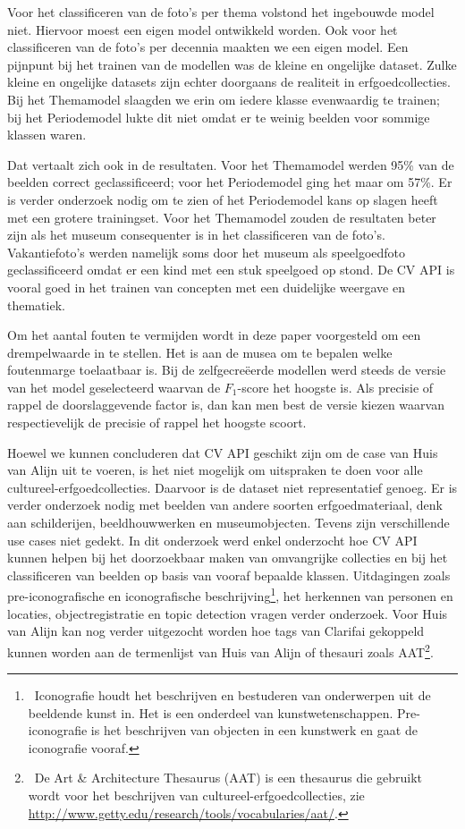 Voor het classificeren van de foto’s per thema volstond het ingebouwde model niet. Hiervoor moest een eigen model ontwikkeld worden. Ook voor het classificeren van de foto’s per decennia maakten we een eigen model. Een pijnpunt bij het trainen van de modellen was de kleine en ongelijke dataset. Zulke kleine en ongelijke datasets zijn echter doorgaans de realiteit in erfgoedcollecties. Bij het Themamodel slaagden we erin om iedere klasse evenwaardig te trainen; bij het Periodemodel lukte dit niet omdat er te weinig beelden voor sommige klassen waren.

Dat vertaalt zich ook in de resultaten. Voor het Themamodel werden 95\% van de beelden correct geclassificeerd; voor het Periodemodel ging het maar om 57\%. Er is verder onderzoek nodig om te zien of het Periodemodel kans op slagen heeft met een grotere trainingset. Voor het Themamodel zouden de resultaten beter zijn als het museum consequenter is in het classificeren van de foto’s. Vakantiefoto’s werden namelijk soms door het museum als speelgoedfoto geclassificeerd omdat er een kind met een stuk speelgoed op stond. De CV API is vooral goed in het trainen van concepten met een duidelijke weergave en thematiek.

Om het aantal fouten te vermijden wordt in deze paper voorgesteld om een drempelwaarde in te stellen. Het is aan de musea om te bepalen welke foutenmarge toelaatbaar is. Bij de zelfgecreëerde modellen werd steeds de versie van het model geselecteerd waarvan de $F_1$-score het hoogste is. Als precisie of rappel de doorslaggevende factor is, dan kan men best de versie kiezen waarvan respectievelijk de precisie of rappel het hoogste scoort.

Hoewel we kunnen concluderen dat CV API geschikt zijn om de case van Huis van Alijn uit te voeren, is het niet mogelijk om uitspraken te doen voor alle cultureel-erfgoedcollecties. Daarvoor is de dataset niet representatief genoeg. Er is verder onderzoek nodig met beelden van andere soorten erfgoedmateriaal, denk aan schilderijen, beeldhouwwerken en museumobjecten. Tevens zijn verschillende use cases niet gedekt. In dit onderzoek werd enkel onderzocht hoe CV API kunnen helpen bij het doorzoekbaar maken van omvangrijke collecties en bij het classificeren van beelden op basis van vooraf bepaalde klassen. Uitdagingen zoals pre-iconografische en iconografische beschrijving\footnote{~Iconografie houdt het beschrijven en bestuderen van onderwerpen uit de beeldende kunst in. Het is een onderdeel van kunstwetenschappen. Pre-iconografie is het beschrijven van objecten in een kunstwerk en gaat de iconografie vooraf.}, het herkennen van personen en locaties, objectregistratie en topic detection vragen verder onderzoek. Voor Huis van Alijn kan nog verder uitgezocht worden hoe tags van Clarifai gekoppeld kunnen worden aan de termenlijst van Huis van Alijn of thesauri zoals AAT\footnote{~De Art \& Architecture Thesaurus (AAT) is een thesaurus die gebruikt wordt voor het beschrijven van cultureel-erfgoedcollecties, zie \url{http://www.getty.edu/research/tools/vocabularies/aat/}.}.